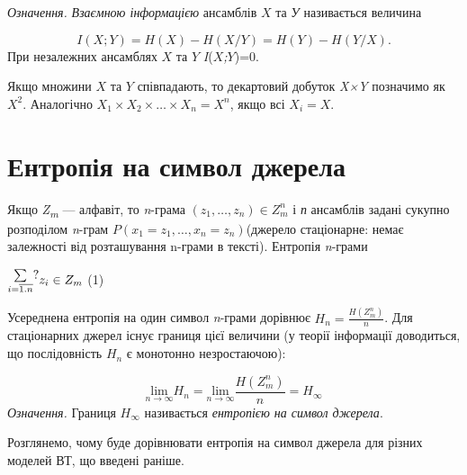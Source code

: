 \bigskip

\textit{Означення.}\textit{  Взаємною інформацією} ансамблів $X$ та
\textit{У }називається величина 

\begin{equation*}
{I(X;Y)=H(X)-H(X/Y)=H(Y)-H(Y/X)\text{.}}
\end{equation*}
При незалежних ансамблях $X$ та $Y$ 
\textit{I}($X$\textit{;}$Y$)=0.


\bigskip

Якщо множини $X$ та $Y$ співпадають, то декартовий добуток
\textit{X×Y} позначимо як  $X^2$. Аналогічно  ${X_{1}\times
X_{2}\times \dots\times X_{n}=X^{n}}$, якщо всі 
$X_i=X$.


\bigskip


\bigskip

\section{Ентропія на символ джерела}


\bigskip


\bigskip

Якщо \textit{Z}\textit{\textsubscript{m}} --- алфавіт, то \textit{n}{}-грама 
$(z_{1},\dots,z_{n})\in Z_m^n$ і \textit{п}
ансамблів задані сукупно розподілом \textit{n}{}-грам 
$P(x_{1}=z_{1},\dots,x_n=z_n)$(джерело
стаціонарне: немає залежності від розташування n-грами в тексті). Ентропія
\textit{n}{}-грами

{\centering
  $\begin{matrix}\underset{i=\overline{1\text{.}n}}{\sum }?\hfill\null
\end{matrix}{z_{i}\in Z_{m}}\hfill $  (1)
\par}

Усереднена ентропія на один символ \textit{n}{}-грами дорівнює 
$H_{n}=\frac{H(Z_{m}^n)}n$. Для стаціонарних джерел існує границя
цієї величини (у теорії інформації доводиться, що послідовність  $H_n$ є
монотонно незростаючою):

\begin{equation*}
{\underset{n\rightarrow \infty }{\text{lim}}H_{n}=\underset{n\rightarrow
\infty }{\text{lim}}\frac{H(Z_{m}^{n})}{n}=H_{\infty }}
\end{equation*}
\textit{Означення.} Границя  $H_{\infty }$ називається \textit{ентропією на
символ джерела}. 


\bigskip

Розглянемо, чому буде дорівнювати ентропія на символ джерела для різних моделей
ВТ, що введені раніше.

